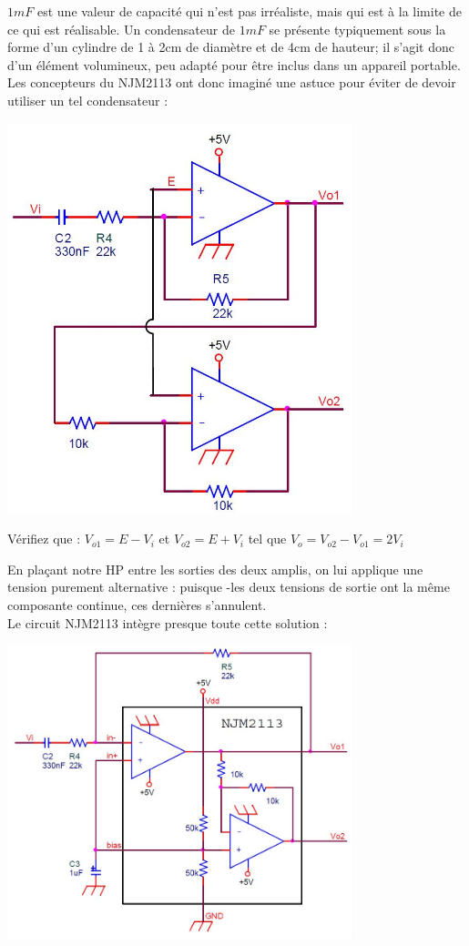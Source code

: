 \documentclass{../template/labo}
\begin{document}
$1mF$ est une valeur de capacité qui n'est pas irréaliste, mais qui est à la limite de ce qui est réalisable. Un condensateur de $1mF$ se présente typiquement sous la forme d'un cylindre de 1 à 2cm de diamètre et de 4cm de hauteur; il s'agit donc d'un élément volumineux, peu adapté pour être inclus dans un appareil portable.\\
Les concepteurs du NJM2113 ont donc imaginé une astuce pour éviter de devoir utiliser un tel condensateur :
\begin{center}
\includegraphics[width=10cm]{figures/AOPetage32}
\end{center}

\Question
{
Vérifiez que : $V_{o1}=E-V_i$ et $V_{o2}=E+V_i$ tel que $V_o=V_{o2}-V_{o1}=2V_i$
}
{}

En plaçant notre HP entre les sorties des deux amplis, on lui applique une tension purement alternative : puisque -les deux tensions de sortie ont la même composante continue, ces dernières s'annulent.\\
Le circuit NJM2113 intègre presque toute cette solution :
\begin{center}
\includegraphics[width=10cm]{figures/NJM}
\end{center}
\end{document}
